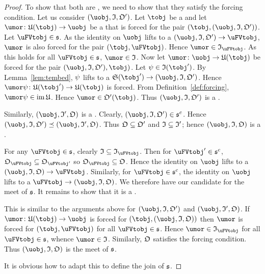 \documentclass[%
a4paper,%
arxiv,%
defaults
]{myclass}
\begin{document}
\begin{proof}
To show that both are \uFVtobjs, we need to show that they satisfy the  forcing condition.
Let us consider \((\uobj, \itest, \otest')\).
Let \(\tobj\) be a \tobj and let \(\umor \colon \ufunc(\tobj) \to \uobj\) be a \umor that is forced for the pair \((\tobj, (\uobj, \itest, \otest'))\).
Let \(\uFVtobj \in \family{S}\).
As the identity on \(\uobj\) lifts to a \uVtmor \((\uobj, \itest, \otest') \to \uFVtobj\), \(\umor\) is also forced for the pair \((\tobj, \uFVtobj)\).
Hence \(\umor \in \itest_{\uFVtobj}\).
As this holds for all \(\uFVtobj \in \family{S}\), \(\umor \in \itest\).
Now let \(\umor \colon \uobj \to \ufunc(\tobj)\) be forced for the pair \((\uobj, \itest, \otest'), \tobj)\).
Let \(\ifn \in \itest(\tobj')\).
By Lemma~\ref{lem:tembed}, \(\psi\) lifts to a \uVtmor \(\sfunc(\tobj') \to (\uobj, \itest, \otest')\).
Hence \(\umor \ifn \colon \ufunc(\tobj') \to \ufunc(\tobj)\) is forced.
From Definition~\ref{def:forcing}, \(\umor \ifn \in \im \ufunc\).
Hence \(\umor \in \otest'(\tobj)\).
Thus \((\uobj, \itest, \otest')\) is a \uFVtobj.

Similarly, \((\uobj, \itest', \otest)\) is a \uFVtobj.
Clearly, \((\uobj, \itest, \otest') \in \family{S}^c\).
Hence \((\uobj, \itest, \otest') \preceq (\uobj, \itest', \otest)\).
Thus \(\otest \subseteq \otest'\) and \(\itest \subseteq \itest'\); hence \((\uobj, \itest, \otest)\) is a \uVtobj.

For any \(\uFVtobj \in \family{S}\), clearly \(\itest \subseteq \itest_{\uFVtobj}\).
Then for \(\uFVtobj' \in \family{S}^c\), \(\otest_{\uFVtobj} \subseteq \otest_{\uFVtobj'}\) so \(\otest_{\uFVtobj} \subseteq \otest\).
Hence the identity on \(\uobj\) lifts to a \uVtmor \((\uobj, \itest, \otest) \to \uFVtobj\).
Similarly, for \(\uFVtobj \in \family{S}^c\), the identity on \(\uobj\) lifts to a \uVtmor \(\uFVtobj \to (\uobj, \itest, \otest)\).
We therefore have our candidate for the meet of \(\family{S}\).
It remains to show that it is a \uFVtobj.

This is similar to the arguments above for \((\uobj, \itest, \otest')\) and \((\uobj, \itest', \otest)\).
If \(\umor \colon \ufunc(\tobj) \to \uobj\) is forced for \((\tobj, (\uobj, \itest, \otest))\) then \(\umor\) is forced for \((\tobj, \uFVtobj)\) for all \(\uFVtobj \in \family{S}\).
Hence \(\umor \in \itest_{\uFVtobj}\) for all \(\uFVtobj \in \family{S}\), whence \(\umor \in \itest\).
Similarly, \(\otest\) satisfies the forcing condition.
Thus \((\uobj, \itest, \otest)\) is the meet of \(\family{S}\).

It is obvious how to adapt this to define the join of \(\family{S}\).
\end{proof}
\end{document}
